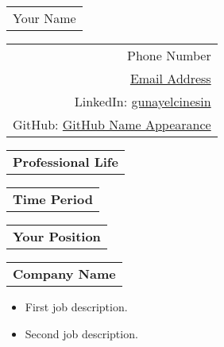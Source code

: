 \documentclass{article}
\begin{document}
  \begin{tcolorbox}
    {\fontsize{21}{11}\bfseries\begin{tabular}[c]{l}
      Your Name %
    \end{tabular}}\hfill
    {\small\begin{tabular}[c]{r}
      Phone Number \\ %
      \href{mailto: Email Address}{Email Address} \\ %
      LinkedIn: \href{LinkedIn url}{gunayelcinesin} \\ %
      GitHub: \href{GitHub url}{GitHub Name Appearance} \\ %
    \end{tabular}}
  \end{tcolorbox}

    \bigskip
    
    \begin{tabular}[c]{l}
      \textbf{Professional Life} \end{tabular} 
      \hline \hline \vspace{2pt}
      \begin{tabular}[c]{l} \textbf{Time Period} \end{tabular} \hfill
      \begin{tabular}[c]{c} \textbf{Your Position} \end{tabular} \hfill
      \begin{tabular}[c]{r} \textbf{Company Name} 
    \end{tabular}
    
   \begin{description}[style=nextline, listparindent=\parindent, parsep=0pt,                     \vspace{-1pt}]
    \begin{itemize}[, leftmargin=.01in]
        \item First job description.
        \item Second job description.
    \end{itemize}
   \end{description} \\
\end{document}
